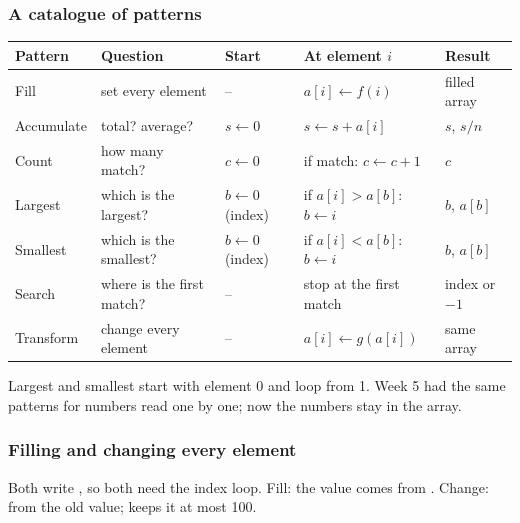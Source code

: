 \documentclass[aspectratio=169,10pt,compress]{beamer}
\begin{document}
\begin{frame}[t,fragile] \frametitle{A catalogue of patterns}


\begin{table}
		\footnotesize
		\begin{tabular}{@{}L{0.12\textwidth}L{0.21\textwidth}L{0.16\textwidth}L{0.25\textwidth}L{0.13\textwidth}@{}}
			\toprule
			\textbf{Pattern} & \textbf{Question} & \textbf{Start} & \textbf{At element $i$} & \textbf{Result} \\
			\midrule
			Fill       & set every element         & --                     & $a[i] \gets f(i)$             & filled array \\
			Accumulate & total? average?           & $s \gets 0$            & $s \gets s + a[i]$            & $s$, $s / n$ \\
			Count      & how many match?           & $c \gets 0$            & if match: $c \gets c + 1$     & $c$ \\
			Largest    & which is the largest?     & $b \gets 0$ (index) & if $a[i] > a[b]$: $b \gets i$ & $b$, $a[b]$ \\
			Smallest   & which is the smallest?    & $b \gets 0$ (index) & if $a[i] < a[b]$: $b \gets i$ & $b$, $a[b]$ \\
			Search     & where is the first match? & --                     & stop at the first match       & index or $-1$ \\
			Transform  & change every element      & --                     & $a[i] \gets g(a[i])$          & same array \\
			\bottomrule
		\end{tabular}
\end{table}%


	\vspace{0.3em}
	\small Largest and smallest start with element 0 and loop from 1.
	Week 5 had the same patterns for numbers read one by one; now the numbers stay in the array.
\end{frame}




\begin{frame}[t,fragile] \frametitle{Filling and changing every element}

	\footnotesize Both write , so both need the index loop. Fill: the value comes from .
	Change: from the old value;  keeps it at most 100.
\end{frame}
\end{document}
